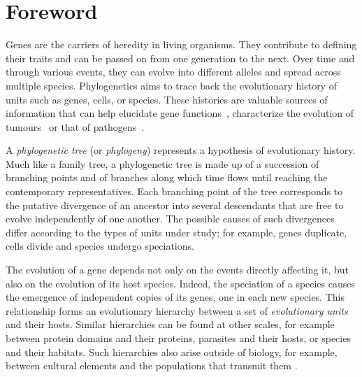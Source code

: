 \chapter*{Foreword}

Genes are the carriers of heredity in living organisms.
They contribute to defining their traits and can be passed on from one generation to the next.
Over time and through various events, they can evolve into different alleles and spread across multiple species.
Phylogenetics aims to trace back the evolutionary history of units such as genes, cells, or species.
These histories are valuable sources of information that can help elucidate gene functions~\parencite{Lynch2001ProbabilityPreservationNewly}, characterize the evolution of tumours~\parencite{Quinn2021SingleCellLineages} or that of pathogens~\parencite{Morel2020PhylogeneticAnalysisSars,Guindon2022EclairerOriginesCOVID19}.

A \emph{phylogenetic tree} (or \emph{phylogeny}) represents a hypothesis of evolutionary history.
Much like a family tree, a phylogenetic tree is made up of a succession of branching points and of branches along which time flows until reaching the contemporary representatives.
Each branching point of the tree corresponds to the putative divergence of an ancestor into several descendants that are free to evolve independently of one another.
The possible causes of such divergences differ according to the types of units under study; for example, genes duplicate, cells divide and species undergo speciations.

The evolution of a gene depends not only on the events directly affecting it, but also on the evolution of its host species.
Indeed, the speciation of a species causes the emergence of independent copies of its genes, one in each new species.
This relationship forms an evolutionary hierarchy between a set of \emph{evolutionary units} and their hosts.
Similar hierarchies can be found at other scales, for example between protein domains and their proteins, parasites and their hosts, or species and their habitats.
Such hierarchies also arise outside of biology, for example, between cultural elements and the populations that transmit them \parencite{Tehrani2010CophylogenyPopulationsCultures}.

